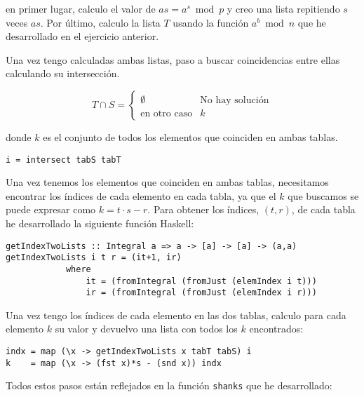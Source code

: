 \documentclass[10pt,spanish]{article}
\begin{document}
en primer lugar, calculo el valor de $as=a^s \bmod p$ y creo una lista repitiendo $s$ veces $as$. Por último, calculo la lista $T$ usando la función $a^b \bmod n$ que he desarrollado en el ejercicio anterior.

Una vez tengo calculadas ambas listas, paso a buscar coincidencias entre ellas calculando su intersección.

\begin{displaymath}
T \cap S = \begin{cases}
\emptyset & \text{No hay solución} \\
\text{en otro caso} & k
\end{cases}  
\end{displaymath}

donde $k$ es el conjunto de todos los elementos que coinciden en ambas tablas.

\begin{verbatim}
i = intersect tabS tabT
\end{verbatim}

Una vez tenemos los elementos que coinciden en ambas tablas, necesitamos encontrar los índices de cada elemento en cada tabla, ya que el $k$ que buscamos se puede expresar como $k = t \cdot s - r$.  Para obtener los índices, $(t,r)$, de cada tabla he desarrollado la siguiente función Haskell:

\begin{verbatim}
getIndexTwoLists :: Integral a => a -> [a] -> [a] -> (a,a)
getIndexTwoLists i t r = (it+1, ir)
            where
                it = (fromIntegral (fromJust (elemIndex i t)))
                ir = (fromIntegral (fromJust (elemIndex i r)))
\end{verbatim}

Una vez tengo los índices de cada elemento en las dos tablas, calculo para cada elemento $k$ su valor y devuelvo una lista con todos los $k$ encontrados:

\begin{verbatim}
indx = map (\x -> getIndexTwoLists x tabT tabS) i
k    = map (\x -> (fst x)*s - (snd x)) indx
\end{verbatim}

Todos estos pasos están reflejados en la función \texttt{shanks} que he desarrollado:
\end{document}
